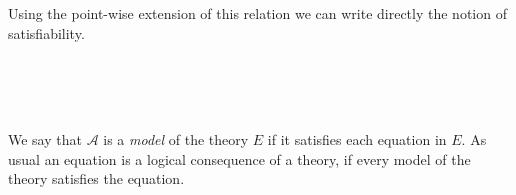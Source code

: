 \noindent Using the point-wise extension of this relation we can write
directly the notion of satisfiability.

\begin{code}
\>[0]\AgdaSpace{}%
\AgdaSymbol{:}\AgdaSpace{}%
\AgdaSpace{}%
\AgdaSymbol{(}\AgdaSpace{}%
\AgdaSymbol{:}\AgdaSpace{}%
\AgdaSpace{}%
\AgdaSymbol{)}\AgdaSpace{}%
\AgdaSymbol{\{}\AgdaSpace{}%
\AgdaSymbol{:}\AgdaSpace{}%
\AgdaSpace{}%
\AgdaSymbol{\}}\AgdaSpace{}%
\AgdaSymbol{\{}\AgdaSpace{}%
\AgdaSymbol{:}\AgdaSpace{}%
\AgdaSpace{}%
\AgdaSymbol{\}}\AgdaSpace{}%
\AgdaSpace{}%
\AgdaSpace{}%
\AgdaSpace{}%
\AgdaSpace{}%
\AgdaSpace{}%
\<%
\\
\>[0]%
\>[423I]\AgdaSpace{}%
\AgdaSymbol{\{}\AgdaSpace{}%
\AgdaSymbol{=}\AgdaSpace{}%
\AgdaSymbol{\}}\AgdaSpace{}%
\AgdaSymbol{\{}\AgdaSymbol{\}}\AgdaSpace{}%
\AgdaSymbol{(}\AgdaSpace{}%
\AgdaSpace{}%
\AgdaSpace{}%
\AgdaSymbol{(}\AgdaSpace{}%
\AgdaOperator{\AgdaInductiveConstructor{,}}\AgdaSpace{}%
\AgdaSymbol{))}\AgdaSpace{}%
\AgdaSymbol{=}\<%
\\
\>[.][@{}l@{}]\<[423I]%
\>[4]\AgdaSymbol{(}\AgdaSpace{}%
\AgdaSymbol{:}\AgdaSpace{}%
\AgdaSpace{}%
\AgdaSpace{}%
\AgdaSpace{}%
\AgdaSymbol{)}\AgdaSpace{}%
\AgdaSpace{}%
\AgdaSymbol{(}\AgdaSpace{}%
\AgdaOperator{\AgdaFunction{,}}\AgdaSpace{}%
\AgdaSpace{}%
\AgdaSymbol{)}\AgdaSpace{}%
\AgdaSpace{}%
\AgdaSpace{}%
\AgdaSpace{}%
\AgdaSpace{}%
\AgdaOperator{\AgdaFunction{,}}\AgdaSpace{}%
\AgdaSpace{}%
\AgdaSpace{}%
\<%
\\
%
\end{code}

\noindent We say that $\mathcal{A}$ is a \emph{model} of the theory
$E$ if it satisfies each equation in $E$. As usual an equation is a
logical consequence of a theory, if every model of the theory
satisfies the equation.

